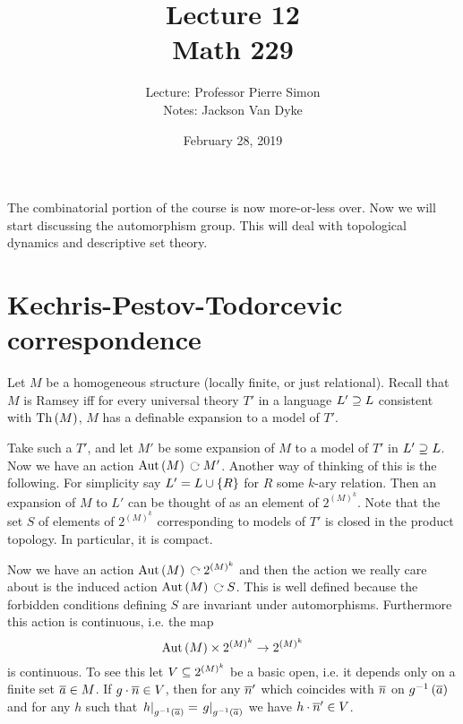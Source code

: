 \documentclass{amsart}
\begin{document}
\title{Lecture 12\\Math 229}
\author{Lecture: Professor Pierre Simon\\Notes: Jackson Van Dyke}
\date{February 28, 2019}
\maketitle

The combinatorial portion of the course is now more-or-less over. Now we will start
discussing the automorphism group. This will deal with topological
dynamics and descriptive set theory.

\section{Kechris-Pestov-Todorcevic correspondence}

Let $M$ be a homogeneous structure (locally finite, or just relational).
Recall that $M$ is Ramsey iff for every universal theory $T'$
in a language $L'\supseteq L$ consistent with $\operatorname{Th}\left( M \right)$, $M$ has a definable
expansion to a model of $T'$.

Take such a $T'$, and let $M'$ be some expansion of $M$ to a model of $T'$ in $L'\supseteq
L$. Now we have an action $\Aut\left( M \right)\acts M'$.
Another way of thinking of this is the following. For simplicity say $L' =
L\cup\left\{ R \right\}$ for $R$ some $k$-ary relation. Then an expansion of $M$ to $L'$
can be thought of as an element of $2^{\left( M \right)^k}$.
Note that the set $S$ of elements of $2^{\left( M \right)^k}$ corresponding to
models of $T'$ is closed in the product topology. In particular, it is compact.

Now we have an action $\Aut\left( M \right)\acts 2^{\left( M \right)^k}$ and then the
action we really care about is the induced action $\Aut\left( M \right) \acts S$. 
This is well defined because the forbidden conditions defining $S$ are invariant under
automorphisms. Furthermore this action is continuous, i.e. the map
\begin{equation}
\operatorname{Aut}\left( M \right) \times 2^{\left( M \right)^k} \rightarrow  2^{\left( M \right)^k}
\end{equation}
is continuous. 
To see this let $V\subseteq 2^{\left( M \right)^k}$ be a basic open, i.e. it depends only on a finite set
$\overline{a}\in M$. If $g\cdot \overline{n}\in V$,
then for any $\overline{n}'$ which coincides with $\overline{n}$ on $g^{-1}\left( \overline{a}
\right)$ and
for any $h$ such that $\left.h \right\vert_{g^{-1}\left( \overline{a} \right)} = \left.g \right\vert_{g^{-1}\left(
\overline{a} \right)}$ we have $h\cdot \overline{n}'\in V$.
\end{document}
